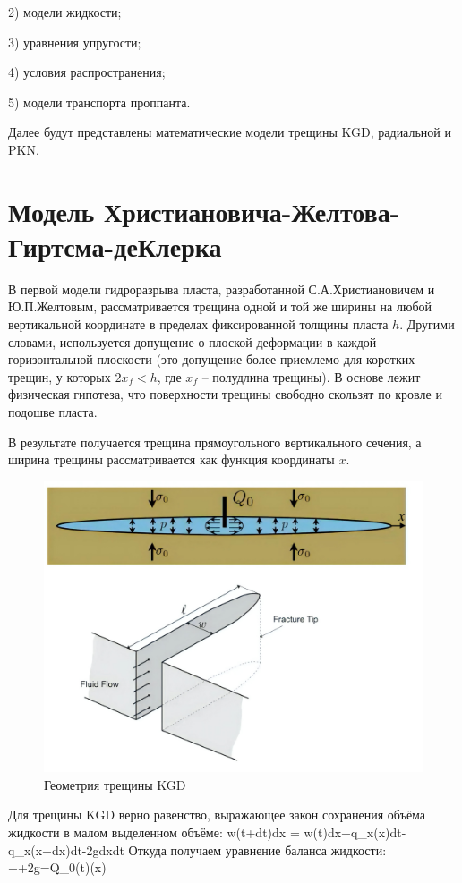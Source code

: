 2) модели жидкости;

3) уравнения упругости;

4) условия распространения;

5) модели транспорта проппанта.

Далее будут представлены математические модели трещины KGD, радиальной и PKN.

\section{Модель Христиановича-Желтова-Гиртсма-деКлерка}

В первой модели гидроразрыва пласта, разработанной С.А.Христиановичем и Ю.П.Желтовым, рассматривается трещина одной и той же ширины на любой вертикальной координате в пределах фиксированной толщины пласта $h$.
Другими словами, используется допущение о плоской деформации в каждой горизонтальной плоскости (это допущение более приемлемо для коротких трещин, у которых $2x_f<h$, где $x_f$ -- полудлина трещины).
В основе лежит физическая гипотеза, что поверхности трещины свободно скользят по кровле и подошве пласта.

В результате получается трещина прямоугольного вертикального сечения, а ширина трещины рассматривается как функция координаты $x$.

\begin{figure}[H] 
\center
\includegraphics[width=0.7\linewidth]{images/kgd_model_better.jpg}
\caption{Геометрия трещины KGD} 
\label{fig:kgd-model-geometry}  
\end{figure}


Для трещины KGD верно равенство, выражающее закон сохранения объёма жидкости в малом выделенном объёме:
\beq
w(t+dt)dx = w(t)dx+q_x(x)dt-q_x(x+dx)dt-2gdxdt
\eeq
Откуда получаем уравнение баланса жидкости:
\beq
{}++2g=Q_0(t)\delta(x)
\eeq


